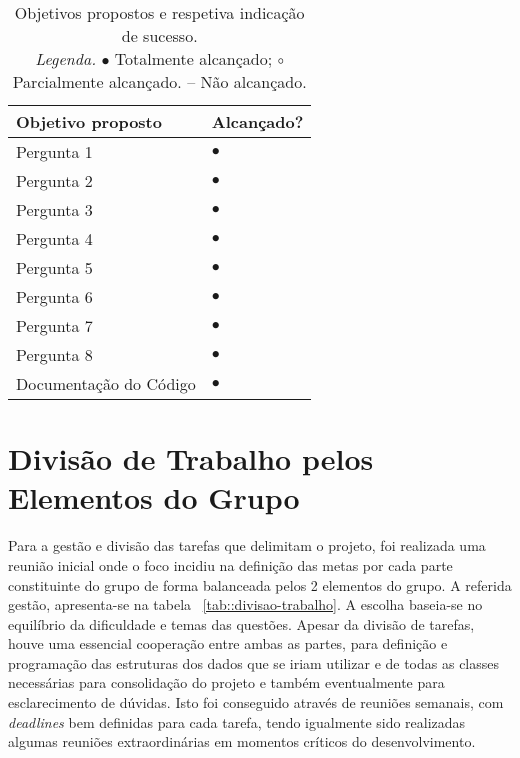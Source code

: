 \begin{table}[!htbp]
	\centering
	\begin{tabular}{p{} >{\centering\let\newline\\\arraybackslash\hspace{0pt}}m{}}
		\toprule
		{\bfseries Objetivo proposto} & {\bfseries Alcançado?} \\
		\midrule
		Pergunta 1 & $\bullet$             \\
		Pergunta 2 & $\bullet$             \\
		Pergunta 3 & $\bullet$             \\
		Pergunta 4 & $\bullet$             \\
		Pergunta 5 & $\bullet$             \\
		Pergunta 6 & $\bullet$             \\
		Pergunta 7 & $\bullet$             \\
		Pergunta 8 & $\bullet$             \\
		Documentação do Código & $\bullet$ \\
		\bottomrule
	\end{tabular}
	\caption[Objetivos propostos vs. alcançados]{
		Objetivos propostos e respetiva indicação de sucesso.\\
		\textit{Legenda.} $\bullet$ Totalmente alcançado; $\circ$ Parcialmente alcançado. -- Não alcançado.
	}
	\label{tab::objetivos}
\end{table}

\section{Divisão de Trabalho pelos Elementos do Grupo}
\label{sec::reflexao:divisao}

Para a gestão e divisão das tarefas que delimitam o projeto, foi realizada uma reunião inicial onde o foco incidiu na definição das metas por cada parte constituinte do grupo de forma balanceada pelos 2 elementos do grupo. A referida gestão, apresenta-se na tabela ~\ref{tab::divisao-trabalho}. A escolha baseia-se no equilíbrio da dificuldade e temas das questões. Apesar da divisão de tarefas, houve uma essencial cooperação entre ambas as partes, para definição e programação das estruturas dos dados que se iriam utilizar e de todas as classes necessárias para consolidação do projeto e também eventualmente para esclarecimento de dúvidas. Isto foi conseguido através de reuniões semanais, com \textit{deadlines} bem definidas para cada tarefa, tendo igualmente sido realizadas algumas reuniões extraordinárias em momentos críticos do desenvolvimento.


